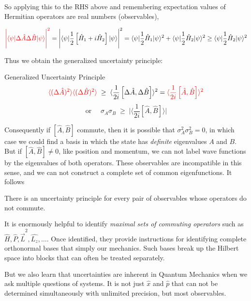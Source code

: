 So applying this to the RHS above and remembering expectation values of
Hermitian operators are real numbers (observables), 

\[
  \textcolor{red}{\Bigg| \langle \psi | \Delta \hat{A} \Delta \hat{B} | \psi
  \rangle \Bigg|^2 } = \Bigg| \langle \psi | \frac{1}{2} \left[ \hat{H}_1
  + i \hat{H}_2 \right] |\psi\rangle \Bigg|^2 = \langle \psi | \frac{1}{2}
  \hat{H}_1 | \psi \rangle^2 + \langle \psi | \frac{1}{2} \hat{H}_2
  |\psi\rangle ^2 \geq \langle \psi | \frac{1}{2} \hat{H}_2 |\psi\rangle^2
\] \vspace{3px}

Thus we obtain the generalized uncertainty principle: 

\begin{subbox}{Generalized Uncertainty Principle}
  \[ \textcolor{red}{\langle (\Delta \hat{A})^2 \rangle \langle (\Delta
    \hat{B})^2 \rangle}\; \geq\;
    \langle \frac{1}{2i} \left[ \Delta \hat{A}, \Delta \hat{B}\right] \rangle^2
    = \textcolor{red}{\langle \frac{1}{2i} \left[\hat{A}, \hat{B}\right]
  \rangle^2} \]
    \[ \text{or } \quad \sigma_A\sigma_B \; \geq\; \Bigg| \langle \frac{1}{2i} \left[ \hat{A},
    \hat{B} \right] \rangle \Bigg| \] 
\end{subbox}


Consequently if $\left[ \hat{A}, \hat{B}\right]$ commute, then it is possible
that $\sigma_A^2 \sigma_B^2 = 0$, in which case we could find a basis in which
the state has \textit{definite} eigenvalues $A$ and $B$. But if $\left[\hat{A},
\hat{B}\right] \neq 0 $, like position and momentum, we can not label wave
functions by the eigenvalues of both operators. These observables are
incompatible in this sense, and we can not construct a complete set of common
eigenfunctions. It follows 

\begin{mainbox}{}
  There is an uncertainty principle for every pair of observables whose
  operators do not commute.
\end{mainbox}


It is enormously helpful to identify \textit{maximal sets of commuting
operators} such as $\hat{H}, \hat{P}, \hat{\vec{L}}^2, \hat{L_z}, \hdots$. Once
identified, they provide instructions for identifying complete orthonormal
bases that simply our mechanics. Such bases break up the Hilbert space
into blocks that can often be treated separately. 

But we also learn that uncertainties are inherent in Quantum Mechanics when we
ask multiple questions of systems. It is not just $\hat{x}$ and $\hat{p}$ that
can not be determined simultaneously with unlimited precision, but most
observables. 




